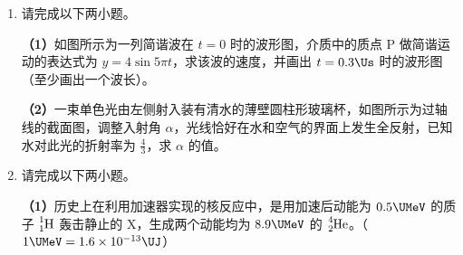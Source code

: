 \documentclass[\gkver]{gaokaozhenti}
\begin{document}
\begin{enumerate}
{（2）微观原因：气体体积不变，分子密集程度不变，温度变小，气体分子平均动能减小，导致气体压强减小。

（3）$Q_{1}$ 大于 $Q_{2}$。因为 $T_{A}=T_{C}$，故 A$\to$B 增加的内能与 B$\to$C 减小的内能相同，而 A$\to$B 过程气体对外做正功，B$\to$C 过程气体不做功，由热力学第一定律可知 $Q_{1}$ 大于 $Q_{2}$。
}

\item
请完成以下两小题。

\textbf{（1）}如图所示为一列简谐波在 $t=0$ 时的波形图，介质中的质点 P 做简谐运动的表达式为 $y=4\sin5\pi t$，求该波的速度，并画出 $t=0.3\Us$ 时的波形图（至少画出一个波长）。


\textbf{（2）}一束单色光由左侧射入装有清水的薄壁圆柱形玻璃杯，如图所示为过轴线的截面图，调整入射角 $\alpha$，光线恰好在水和空气的界面上发生全反射，已知水对此光的折射率为 $\frac{4}{3}$，求 $\alpha$ 的值。



\item
请完成以下两小题。

\textbf{（1）}历史上在利用加速器实现的核反应中，是用加速后动能为 $0.5\UMeV$ 的质子 $\ce{^1_1H}$ 轰击静止的 X，生成两个动能均为 $8.9\UMeV$ 的 $\ce{^4_2He}$。（$1\UMeV=1.6\times10^{-13}\UJ$）


\end{enumerate}
\end{document}
